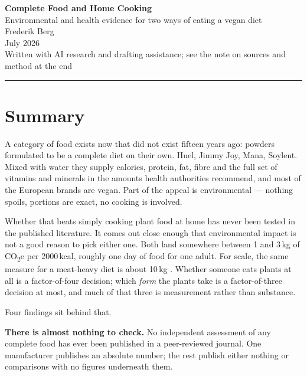 \documentclass[11pt,a4paper]{article}
\newcommand{\co}{CO\textsubscript{2}e}
\begin{document}
\thispagestyle{empty}

\begin{center}
{\LARGE\bfseries Complete Food and Home Cooking}\\[0.5em]
{\large Environmental and health evidence for two ways of eating a vegan diet}\\[1.3em]
{\normalsize Frederik Berg}\\[0.3em]
{\footnotesize\color{srcgrey}July 2026}\\[0.5em]
{\footnotesize\color{srcgrey}Written with AI research and drafting assistance;
 see the note on sources and method at the end}
\end{center}

\vspace{0.8em}
\noindent\textcolor{rule}{\rule{\textwidth}{0.8pt}}
\vspace{0.6em}

\section*{Summary}

A category of food exists now that did not exist fifteen years ago: powders
formulated to be a complete diet on their own. Huel, Jimmy Joy, Mana, Soylent.
Mixed with water they supply calories, protein, fat, fibre and the full set of
vitamins and minerals in the amounts health authorities recommend, and most of the
European brands are vegan. Part of the appeal is environmental — nothing spoils,
portions are exact, no cooking is involved.

Whether that beats simply cooking plant food at home has never been tested in the
published literature. It comes out close enough that environmental impact is not a
good reason to pick either one. Both land somewhere between 1 and 3\,kg of \co{}
per 2000\,kcal, roughly one day of food for one adult. For scale, the same measure
for a meat-heavy diet is about 10\,kg \cite{scarborough}. Whether someone eats
plants at all is a factor-of-four decision; which \emph{form} the plants take is a
factor-of-three decision at most, and much of that three is measurement rather than
substance.

Four findings sit behind that.

\textbf{There is almost nothing to check.} No independent assessment of any complete
food has ever been published in a peer-reviewed journal. One manufacturer publishes
an absolute number; the rest publish either nothing or comparisons with no figures
underneath them.
\end{document}
